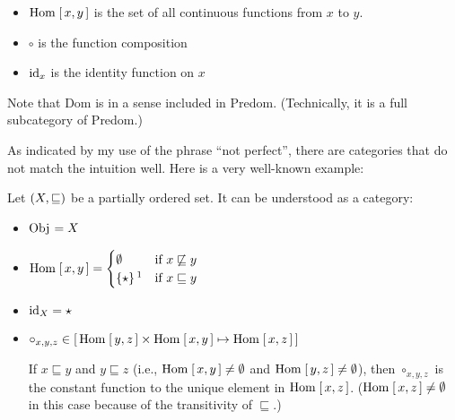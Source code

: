 \begin{enumcirc}
\begin{enumrm}
\begin{itemize}
			\item
			      $\textrm{Hom}_{\textrm{\tiny \ensuremath{{}_{}}}}\left[ \, x, y \, \right]$ is the set of all continuous functions from $x$ to $y$.
			\item
			      $\circ$ is the function composition
			\item
			      $\textrm{id}_x$ is the identity function on $x$
		\end{itemize}
	\end{enumrm}
	Note that Dom is in a sense included in Predom.
	(Technically, it is a full subcategory of Predom.)
	\item
	As indicated by my use of the phrase ``not perfect'', there are categories that
	do not match the intuition well.
	Here is a very well-known example:

	Let $\left( X, \sqsubseteq \right)$ be a partially ordered set.
	It can be understood as a category:
	\begin{itemize}
		\item
		      $\textrm{Obj}_{\textrm{\tiny \ensuremath{{}_{}}}} = X$
		\item
		      $\Homset{x}{y} = \begin{cases}
				      \emptyset                    & \text{if } x \not\sqsubseteq y \\
				      \braces{\star} \footnotemark & \text{if } x \sqsubseteq y     \\
			      \end{cases}
		      $
		\item
		      $\textrm{id}_X = \star$
		\item
		      $\circ_{x,y,z} \in \left[ \, \textrm{Hom}_{\textrm{\tiny \ensuremath{{}_{}}}}\left[ \, y, z \, \right] \times \textrm{Hom}_{\textrm{\tiny \ensuremath{{}_{}}}}\left[ \, x, y \, \right] \mapsto \textrm{Hom}_{\textrm{\tiny \ensuremath{{}_{}}}}\left[ \, x, z \, \right] \, \right]$

		      If $x \sqsubseteq y$ and $y \sqsubseteq z$ (i.e., $\textrm{Hom}_{\textrm{\tiny \ensuremath{{}_{}}}}\left[ \, x, y \, \right] \neq
			      \emptyset$ and $\textrm{Hom}_{\textrm{\tiny \ensuremath{{}_{}}}}\left[ \, y, z \, \right] \neq \emptyset$),
		      then $\circ_{x,y,z}$ is the constant function to the unique element in
		      $\textrm{Hom}_{\textrm{\tiny \ensuremath{{}_{}}}}\left[ \, x, z \, \right]$.
		      ($\textrm{Hom}_{\textrm{\tiny \ensuremath{{}_{}}}}\left[ \, x, z \, \right] \ne \emptyset$ in this case because of the transitivity of $\sqsubseteq$.)


\end{itemize}
\end{enumcirc}
